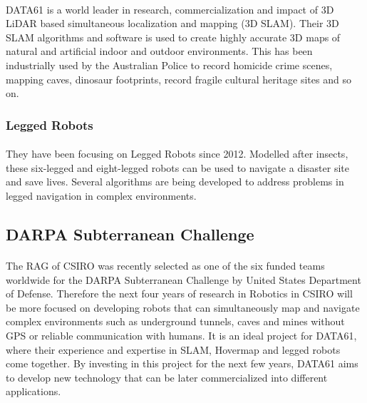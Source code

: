 \paragraph{}
DATA61 is a world leader in research, commercialization and impact of 3D LiDAR based simultaneous localization and mapping (3D SLAM). Their 3D SLAM algorithms and software is used to create highly accurate 3D maps of natural and artificial indoor and outdoor environments. This has been industrially used by the Australian Police to record homicide crime scenes, mapping caves, dinosaur footprints, record fragile cultural heritage sites and so on.

\subsubsection*{Legged Robots}
\paragraph{}
They have been focusing on Legged Robots since 2012. Modelled after insects, these six-legged and eight-legged robots can be used to navigate a disaster site and save lives. Several algorithms are being developed to address problems in legged navigation in complex environments.


\subsection{DARPA Subterranean Challenge}
\label{ssec:darpa}
\paragraph{}
The RAG of CSIRO was recently selected as one of the six funded teams worldwide for the DARPA Subterranean Challenge \cite{darpa} by United States Department of Defense. Therefore the next four years of research in Robotics in CSIRO will be more focused on developing robots that can simultaneously map and navigate complex environments such as underground tunnels, caves and mines without GPS or reliable communication with humans. It is an ideal project for DATA61, where their experience and expertise in SLAM, Hovermap and legged robots come together. By investing in this project for the next few years, DATA61 aims to develop new technology that can be later commercialized into different applications. 

